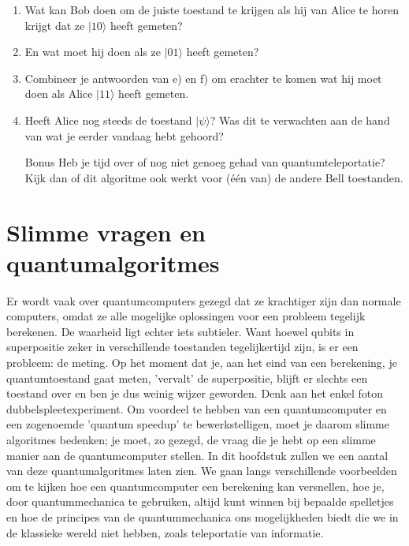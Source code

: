 \documentclass[../../main.tex]{subfiles}
\begin{document}
\begin{antwoord}
\end{antwoord}
\begin{opdracht}
\begin{enumerate}
\item Wat kan Bob doen om de juiste toestand te krijgen als hij van Alice te horen krijgt dat ze $|10\rangle$ heeft gemeten?
\item En wat moet hij doen als ze $|01\rangle$ heeft gemeten?
\item Combineer je antwoorden van e) en f) om erachter te komen wat hij moet doen als Alice $|11\rangle$ heeft gemeten.
\item Heeft Alice nog steeds de toestand $|\psi\rangle$? Was dit te verwachten aan de hand van wat je eerder vandaag hebt gehoord?
\item [Bonus] Heb je tijd over of nog niet genoeg gehad van quantumteleportatie? Kijk dan of dit algoritme ook werkt voor (\'e\'en van) de andere Bell toestanden.
\end{enumerate}
\end{opdracht}


\section{Slimme vragen en quantumalgoritmes}
Er wordt vaak over quantumcomputers gezegd dat ze krachtiger zijn dan normale computers, omdat ze alle mogelijke oplossingen voor een probleem tegelijk berekenen. De waarheid ligt echter iets subtieler. Want hoewel qubits in superpositie zeker in verschillende toestanden tegelijkertijd zijn, is er een probleem: de meting. Op het moment dat je, aan het eind van een berekening, je quantumtoestand gaat meten, 'vervalt' de superpositie, blijft er slechts een toestand over en ben je dus weinig wijzer geworden. Denk aan het enkel foton dubbelspleetexperiment.
Om voordeel te hebben van een quantumcomputer en een zogenoemde 'quantum speedup' te bewerkstelligen, moet je daarom slimme algoritmes bedenken; je moet, zo gezegd, de vraag die je hebt op een slimme manier aan de quantumcomputer stellen. In dit hoofdstuk zullen we een aantal van deze quantumalgoritmes laten zien. We gaan langs verschillende voorbeelden om te kijken hoe een quantumcomputer een berekening kan versnellen, hoe je, door quantummechanica te gebruiken, altijd kunt winnen bij bepaalde spelletjes en hoe de principes van de quantummechanica ons mogelijkheden biedt die we in de klassieke wereld niet hebben, zoals teleportatie van informatie.
\end{document}
